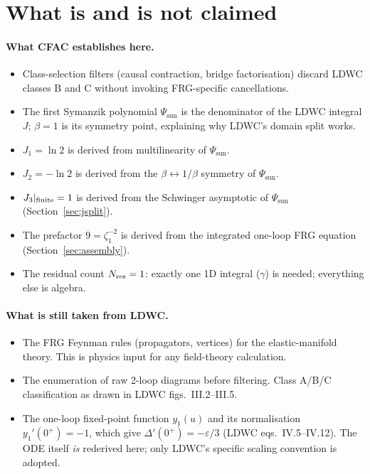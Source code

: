 \documentclass[10pt,a4paper,twocolumn]{article}
\theoremstyle{plain}
\theoremstyle{definition}
\renewcommand{\Psi}{\varPsi}
\newcommand{\eps}{\varepsilon}
\newcommand{\Nres}{N_{\rm res}}
\begin{document}
\section{What is and is not claimed}
\label{sec:claims}

\paragraph{What CFAC establishes here.}
\begin{itemize}
  \item Class-selection filters (causal contraction, bridge
    factorisation) discard LDWC classes B and C without invoking
    FRG-specific cancellations.
  \item The first Symanzik polynomial $\Psi_{\text{sun}}$ is the
    denominator of the LDWC integral $J$; $\beta=1$ is its
    symmetry point, explaining why LDWC's domain split works.
  \item $J_1 = \ln 2$ is derived from multilinearity of $\Psi_{\text{sun}}$.
  \item $J_2 = -\ln 2$ is derived from the $\beta\leftrightarrow 1/\beta$
    symmetry of $\Psi_{\text{sun}}$.
  \item $J_3|_{\rm finite} = 1$ is derived from the Schwinger
    asymptotic of $\Psi_{\text{sun}}$ (Section~\ref{sec:jsplit}).
  \item The prefactor $9 = \zeta_1^{-2}$ is derived from the
    integrated one-loop FRG equation
    (Section~\ref{sec:assembly}).
  \item The residual count $\Nres = 1$: exactly one 1D integral
    ($\gamma$) is needed; everything else is algebra.
\end{itemize}

\paragraph{What is still taken from LDWC.}
\begin{itemize}
  \item The FRG Feynman rules (propagators, vertices) for the
    elastic-manifold theory.  This is physics input for any
    field-theory calculation.
  \item The enumeration of raw 2-loop diagrams before filtering.
    Class A/B/C classification as drawn in LDWC
    figs.~III.2--III.5.
  \item The one-loop fixed-point function $y_1(u)$ and its
    normalisation $y_1'(0^+) = -1$, which give
    $\Delta'(0^+) = -\eps/3$ (LDWC eqs.~IV.5--IV.12).
    The ODE itself \emph{is} rederived here;
    only LDWC's specific scaling convention is adopted.
\end{itemize}
\end{document}
